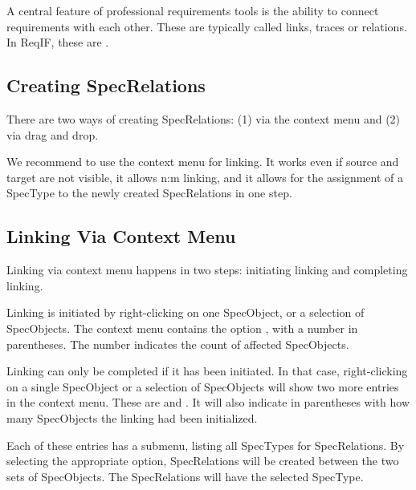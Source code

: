 A central feature of professional requirements tools is the ability to connect requirements with each other.  These are typically called links, traces or relations.  In ReqIF, these are .

\subsection{Creating SpecRelations}
\label{sec:create-links}

There are two ways of creating SpecRelations: (1) via the context menu and (2) via drag and drop.

\begin{info}
We recommend to use the context menu for linking.  It works even if source and target are not visible, it allows n:m linking, and it allows for the assignment of a SpecType to the newly created SpecRelations in one step.
\end{info}



\subsection{Linking Via Context Menu}
\label{sec:context-links}

Linking via context menu happens in two steps: initiating linking and completing linking.

Linking is initiated by right-clicking on one SpecObject, or a selection of SpecObjects.  The context menu contains the option , with a number in parentheses. The number indicates the count of affected SpecObjects.

Linking can only be completed if it has been initiated.  In that case, right-clicking on a single SpecObject or a selection of SpecObjects will show two more entries in the context menu.  These are  and .  It will also indicate in parentheses with how many SpecObjects the linking had been initialized.

Each of these entries has a submenu, listing all SpecTypes for SpecRelations.  By selecting the appropriate option, SpecRelations will be created between the two sets of SpecObjects.  The SpecRelations will have the selected SpecType.

